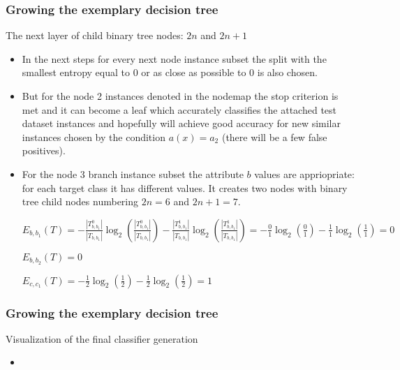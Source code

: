 \documentclass[smaller, proffesionalfonts]{beamer}
\begin{document}
\begin{frame}
\frametitle{Growing the exemplary decision tree}
\begin{block}{The next layer of child binary tree nodes: $2n$ and $2n+1$ }
\begin{itemize}
\item
\justifying
In the next steps for every next node instance subset the split with the smallest entropy equal to 0 or as close as possible to 0 is also chosen. 
\item
But for the node 2 instances denoted in the nodemap the stop criterion is met and it can become a leaf which accurately classifies the attached test dataset instances and hopefully will achieve good accuracy for new similar instances chosen by the condition $a(x)=a_2$ (there will be a few false positives).
\item 
For the node 3 branch instance subset the attribute $b$ values are appriopriate: for each target class it has different values. It creates two nodes with binary tree child nodes numbering $2n=6$ and $2n+1=7$.

$E_{b,b_1}(T)= 
-\frac{|T^{0}_{b,b_1}|}{|T_{b,b_1}|}\log_2(\frac{|T^{0}_{b,b_1}|}{|T_{b,b_1}|}) 
-\frac{|T^{1}_{b,b_1}|}{|T_{b,b_1}|}\log_2(\frac{|T^{1}_{b,b_1}|}{|T_{b,b_1}|}) =
-\frac{0}{1}\log_2(\frac{0}{1})-\frac{1}{1}\log_2(\frac{1}{1})=0$

$E_{b,b_2}(T)=0$

$E_{c,c_1}(T)=-\frac{1}{2}\log_2(\frac{1}{2})-\frac{1}{2}\log_2(\frac{1}{2})=1$

\end{itemize}
\end{block}
\end{frame}

\begin{frame}
\frametitle{Growing the exemplary decision tree}
\begin{block}{Visualization of the final classifier generation}
\begin{itemize}
\item[\ ]
\begin{minipage}[t]{.45\textwidth}
\end{minipage}
\hfill
\begin{minipage}[t]{.45\textwidth}
\end{minipage}
\end{itemize}
\end{block}
\end{frame}
\end{document}
